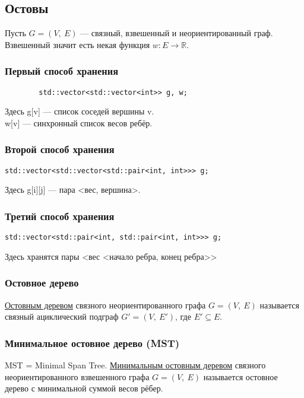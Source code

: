 \documentclass[12pt, a4paper]{article}
\begin{document}
    \subsection[short]{Остовы}
    Пусть $G = (V,\ E)$ --- связный, взвешенный и неориентированный граф.\\
    Взвешенный значит есть некая функция $w: E\longrightarrow \mathbb{R}$.\\
    \subsubsection*{Первый способ хранения}
    \begin{lstlisting}
        std::vector<std::vector<int>> g, w;
    \end{lstlisting}
    Здесь g[v] --- список соседей вершины v.\\
    w[v] --- синхронный список весов ребёр.
    \subsubsection*{Второй способ хранения}
    \begin{lstlisting}
std::vector<std::vector<std::pair<int, int>>> g;
    \end{lstlisting}
    Здесь g[i][j] --- пара <вес, вершина>.
    \subsubsection*{Третий способ хранения}
    \begin{lstlisting}
std::vector<std::pair<int, std::pair<int, int>>> g;
    \end{lstlisting}
    Здесь хранятся пары <вес <начало ребра, конец ребра>>
    \subsubsection{Остовное дерево}
    \underline{Остовным деревом} связного неориентированного графа $G = (V,\ E)$ называется связный ациклический подграф $G' = (V,\ E')$, где $E'\subseteq E$.
    \subsubsection{Минимальное остовное дерево (MST)}
    MST = Minimal Span Tree. \underline{Минимальным остовным деревом} связного неориентированного взвешенного графа $G = (V,\ E)$ называется остовное дерево с минимальной суммой весов рёбер.
\end{document}
